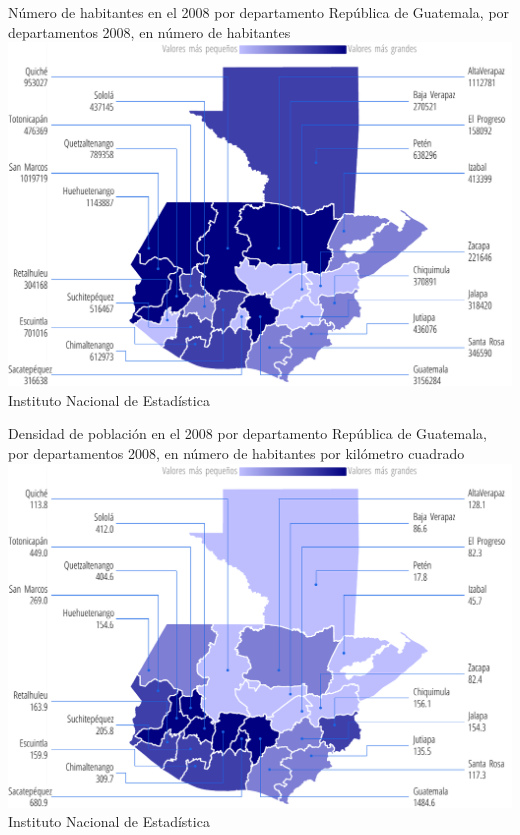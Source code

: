   {%
  }%
  {%
  	Número de habitantes en el 2008 por departamento
  	} %
  {%
  	República de Guatemala, por departamentos 2008, en número de habitantes} %
  {%
  	 \includegraphics[width=52\cuadri]{graficas/1_02.pdf}}%
  {%
  	Instituto Nacional de Estadística} %
  
  
   
   {%
   }%
   {%
   	Densidad de población en el 2008 por departamento
   } %
   {%
   		República de Guatemala, por departamentos 2008, en número de habitantes por kilómetro cuadrado} %
   {%
   	\includegraphics[width=52\cuadri]{graficas/1_05.pdf}}%
   {%
   	Instituto Nacional de Estadística} %
   
   
     
